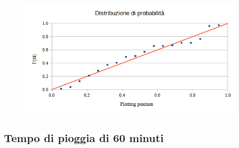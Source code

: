\begin{figure}[H]\centering
    \includegraphics[scale=0.75]{immagini/distr_prob_45min.png}
\end{figure}

\subsection{Tempo di pioggia di 60 minuti}


